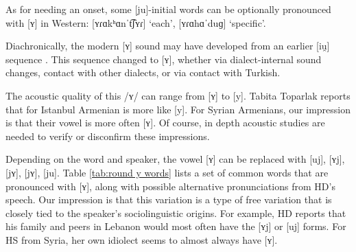    	As for needing an onset, some [ju]-initial words can be optionally pronounced with [ʏ] in Western: [{ʏɾɑkʰɑnˈt͡ʃʏɾ}] `each', [{ʏɾɑhɑˈduɡ}] `specific'.
   	
   	Diachronically, the modern [ʏ] sound may have developed from an earlier [iu̯] sequence \citep{Avetyan-2015-WesternRoundVowel}. This sequence changed to [ʏ], whether via dialect-internal sound changes, contact with other dialects, or via contact with Turkish. 
   	
   	
   	
   	The acoustic quality of this /ʏ/ can range from [ʏ] to [y]. Tabita Toparlak reports that for Istanbul Armenian is more like [y]. For Syrian Armenians, our impression is that their vowel is more often [ʏ]. Of course, in depth acoustic studies are needed to verify or disconfirm these impressions. 
   	
   	
   	
   	Depending on the word and speaker, the vowel [ʏ] can be replaced with [uj], [ʏj], [jʏ], [jʏ], [ju]. Table \ref{tab:round y words} lists a set of common words that are pronounced with [ʏ], along with possible alternative pronunciations from HD's speech. Our impression is that this variation is a type of free variation that is closely tied to the speaker's sociolinguistic origins. For example, HD reports that his family and peers in Lebanon would most often have the [ʏj] or [uj] forms. For HS from Syria, her own idiolect seems to almost always have [ʏ]. 
   	

